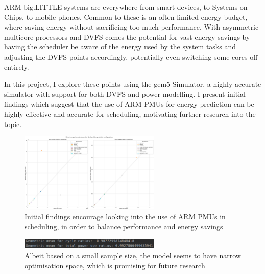 ARM big.LITTLE systems are everywhere from smart devices, to Systems on Chips, 
to mobile phones. Common to these is an often limited energy budget, where 
saving energy without sacrificing too much performance. With asymmetric 
multicore processors and DVFS comes the potential for vast energy savings by 
having the scheduler be aware of the energy used by the system tasks and 
adjusting the DVFS points accordingly, potentially even switching some cores 
off entirely.

In this project, I explore these points using the gem5 Simulator, a highly 
accurate simulator with support for both DVFS and power modelling. I present 
initial findings which suggest that the use of ARM PMUs for energy prediction 
can be highly effective and accurate for scheduling, motivating further research
into the topic.

\begin{figure}[H]
    \centering
    \includegraphics[width=0.6\textwidth]{result-plots/stock-2b2L/system-scatter.png}
    \caption{Initial findings encourage looking into the use of ARM PMUs in
             scheduling, in order to balance performance and energy savings}
\end{figure}
\begin{figure}[H]
    \centering
    \includegraphics[width=0.6\textwidth]{screenshots/promising-geomeans.png}
    \caption{Albeit based on a small sample size, the model seems to have narrow
             optimisation space, which is promising for future research}
\end{figure}
